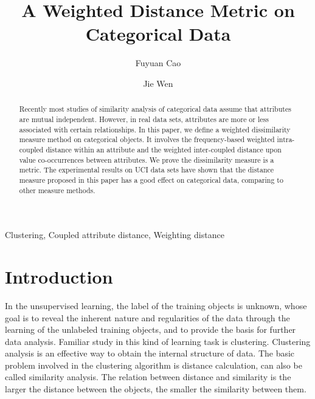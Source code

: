 \documentclass[review]{elsarticle}
\begin{document}
\begin{frontmatter}
\title{A Weighted Distance Metric on Categorical Data}

\author[a]{Fuyuan Cao}

\author[a]{Jie Wen}


\address[a]{Key Laboratory of Computational
Intelligence and Chinese Information Processing of Ministry of
Education, School of Computer and Information Technology, Shanxi
University, Taiyuan 030006, China}

\begin{abstract}
Recently most studies of similarity analysis of categorical data assume that attributes are mutual independent. However, in real data sets, attributes are more or less associated with certain relationships. In this paper, we define a weighted dissimilarity measure method on categorical objects. It involves the frequency-based weighted intra-coupled distance within an attribute and the weighted inter-coupled distance upon value co-occurrences between attributes. We prove the dissimilarity measure is a metric. The experimental results on UCI data sets have shown that the distance measure proposed in this paper has a good effect on categorical data, comparing to other measure methods.
\end{abstract}
\begin{keyword}
Clustering, Coupled attribute distance, Weighting distance
\end{keyword}

\end{frontmatter}

\section{Introduction}
In the unsupervised learning, the label of the training objects is unknown, whose goal is to reveal the inherent nature and regularities of the data through the learning of the unlabeled training objects, and to provide the basis for further data analysis. Familiar study in this kind of learning task is clustering. Clustering analysis is an effective way to obtain the internal structure of data. The basic problem involved in the clustering algorithm is distance calculation, can also be called similarity analysis. The relation between distance and similarity is the larger the distance between the objects, the smaller the similarity between them.
\end{document}
